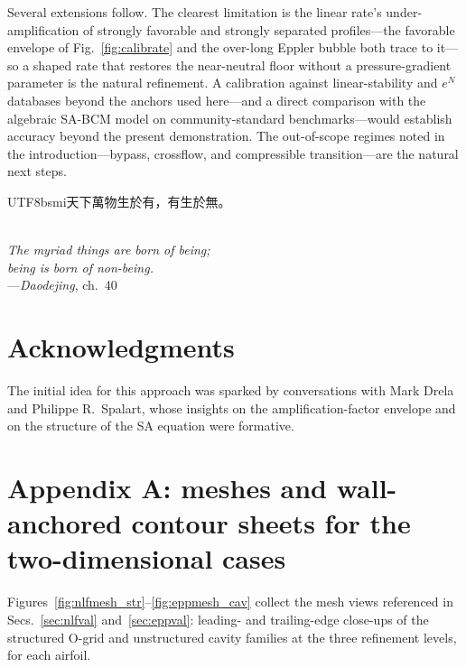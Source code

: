 \documentclass[journal]{new-aiaa}
\begin{document}
Several extensions follow. The clearest limitation is the linear rate's
under-amplification of strongly favorable and strongly separated profiles---the
favorable envelope of Fig.~\ref{fig:calibrate} and the over-long Eppler bubble
both trace to it---so a shaped rate that restores the near-neutral floor without
a pressure-gradient parameter is the natural refinement. A calibration against
linear-stability and $e^N$ databases beyond the anchors used here---and a
direct comparison with the algebraic SA-BCM model on community-standard
benchmarks---would establish accuracy beyond the present demonstration.
The out-of-scope regimes noted in the introduction---bypass, crossflow, and
compressible transition---are the natural next steps.

\begin{center}
  \begin{minipage}{0.6\textwidth}\centering
  \begin{CJK}{UTF8}{bsmi}天下萬物生於有，有生於無。\end{CJK}\\[3pt]
  \emph{The myriad things are born of being;\\
  being is born of non-being.}\\[3pt]
  ---\emph{Daodejing}, ch.~40
  \end{minipage}
\end{center}

\section*{Acknowledgments}
The initial idea for this approach was sparked by conversations with Mark Drela
and Philippe R.\ Spalart, whose insights on the amplification-factor envelope
and on the structure of the SA equation were formative.



\clearpage
\appendix
\renewcommand{\thefigure}{A\arabic{figure}}
\setcounter{figure}{0}
\section*{Appendix A: meshes and wall-anchored contour sheets for the
two-dimensional cases}

Figures~\ref{fig:nlfmesh_str}--\ref{fig:eppmesh_cav} collect the mesh
views referenced in Secs.~\ref{sec:nlfval} and~\ref{sec:eppval}:
leading- and trailing-edge close-ups of the structured O-grid and
unstructured cavity families at the three refinement levels, for each
airfoil.
\end{document}
